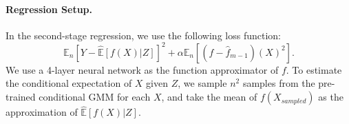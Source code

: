 \documentclass[12pt]{extarticle} %
\newcommand{\E}{\mathbb{E}}
\begin{document}

\paragraph{Regression Setup.}
In the second-stage regression, we use the following loss function: $$
\E_n[Y - \hat{\E}[f(X)|Z]]^2 + \alpha \E_n[(f - \hat{f}_{m-1})(X)^2].
$$
We use a 4-layer neural network as the function approximator of $f$. To estimate the conditional expectation of $X$ given $Z$, we sample $n^2$ samples from the pre-trained conditional GMM for each $X$, and take the mean of $f(X_{sampled})$ as the approximation of $\hat{\E}[f(X)|Z]$.
\end{document}
